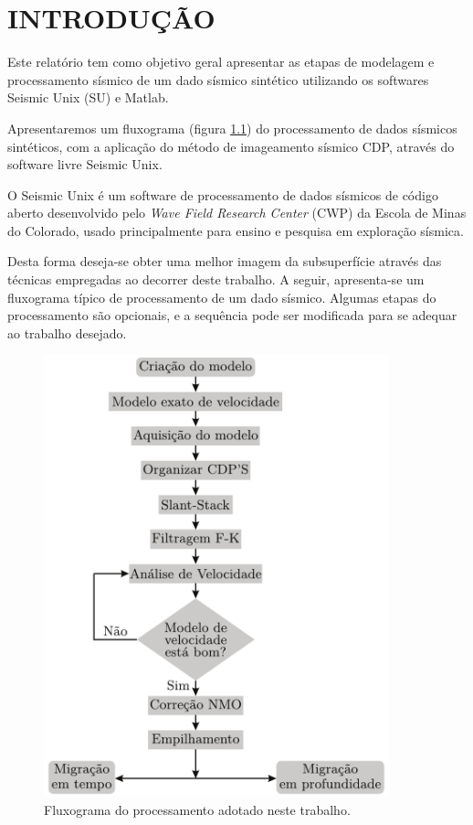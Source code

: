 \chapter{INTRODUÇÃO}
\label{cap1}

Este relatório tem como objetivo geral apresentar as etapas de modelagem e processamento sísmico de um dado sísmico sintético
utilizando os softwares Seismic Unix (SU) e Matlab.

Apresentaremos um fluxograma (figura \ref{fig:fluxograma}) do processamento de dados sísmicos sintéticos, com a aplicação do método de imageamento sísmico CDP, através do software livre Seismic Unix.

O Seismic Unix é um software de processamento de dados sísmicos de código aberto desenvolvido pelo \textit{Wave Field Research Center}
(CWP) da Escola de Minas do Colorado, usado principalmente para ensino e pesquisa em exploração sísmica.

Desta forma deseja-se obter uma melhor imagem da subsuperfície através das técnicas empregadas ao decorrer deste trabalho. A seguir, apresenta-se um fluxograma típico de processamento de um dado sísmico. Algumas etapas do processamento são opcionais, e a sequência pode ser modificada para se adequar ao trabalho desejado.


\begin{figure}[H]
\centering
\includegraphics[width=10cm]{figuras/cap1/fluxograma.pdf}
\caption{Fluxograma do processamento adotado neste trabalho.}
\label{fig:fluxograma}
\end{figure}
